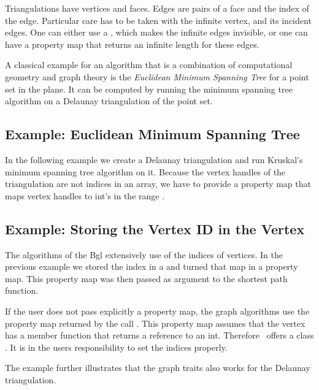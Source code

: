 Triangulations have vertices and faces. Edges are pairs of a face and the
index of the edge.
Particular care has to be taken with the infinite vertex, and its incident
edges. One can either use a , which makes the infinite edges
invisible, or one can have a property map that returns an infinite length
for these edges.


A classical example for an algorithm that is a combination of
computational geometry and graph theory is the {\em Euclidean Minimum
Spanning Tree} for a point set in the plane.  It can be computed by
running the minimum spanning tree algorithm on a Delaunay
triangulation of the point set.

\subsection{Example: Euclidean Minimum Spanning Tree}

In the following example we create a Delaunay triangulation and run Kruskal's minimum
spanning tree algorithm on it. Because the vertex handles of the triangulation are not indices
in an array, we have to provide a property map that maps vertex handles to
int's in the range \ccc{[0, t.number_of_vertices())}.



\subsection{Example: Storing the Vertex ID in the Vertex}

The algorithms of the {\sc Bgl} extensively use of the indices of
vertices. In the previous example we stored the index in a 
and turned that map in a property map. This property map was then
passed as argument to the shortest path function.

If the user does not pass explicitly a property map, the graph algorithms
use the property map returned by the call .
This property map assumes that the vertex has a 
member function  that returns a reference to an int.
Therefore \cgal\ offers a class .
It is in the users responsibility to set the indices properly.

The example further illustrates that the graph traits also works
for the Delaunay triangulation.



